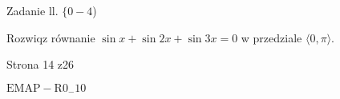 \documentclass[a4paper,12pt]{article}
\begin{document}
Zadanie ll. $\{0-4$)

Rozwiqz równanie $\sin x+\sin 2x+\sin 3x=0$ w przedziale $\langle 0, \pi\rangle.$

Strona 14 z26

$\mathrm{E}\mathrm{M}\mathrm{A}\mathrm{P}-\mathrm{R}0_{-}10$
\end{document}
